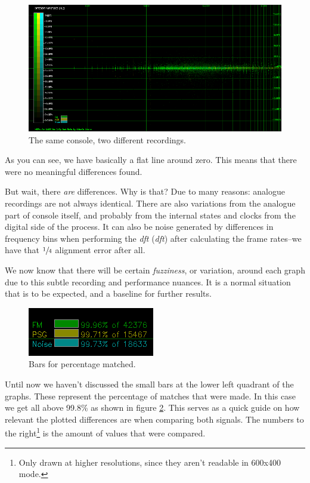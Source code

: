 \documentclass[10pt,a4paper]{report}
\newcommand{\define}[1]{\textit{\acrlong{#1}} (\textit{\acrshort{#1}})}
\begin{document}
\begin{figure}[H]
	\centering
	\includegraphics[width=1\linewidth]{images/interpretation/Plot2-Sameconsole.png}
	\caption[Same console compared]{The same console, two different recordings.}
	\label{fig:plot2-sameconsole}
\end{figure}

As you can see, we have basically a flat line around zero. This means that there were no meaningful differences found. 

But wait, there \textit{are} differences. Why is that? Due to many reasons: analogue recordings are not always identical. There are also variations from the analogue part of console itself, and probably from the internal states and clocks from the digital side of the process. It can also be noise generated by differences in frequency bins when performing the \define{dft} after calculating the frame rates--we have that $\sfrac{1}{4}$ alignment error after all.

We now know that there will be certain \textit{fuzziness}, or variation, around each graph due to this subtle recording and performance nuances. It is a normal situation that is to be expected, and a baseline for further results.

\begin{figure}[H]
	\centering
	\includegraphics[width=0.4\linewidth]{images/interpretation/Plot2-Sameconsole-bars.png}
	\caption[Bars]{Bars for percentage matched.}
	\label{fig:plot2-sameconsole-bars}
\end{figure}

Until now we haven't discussed the small bars at the lower left quadrant of the graphs. These represent the percentage of matches that were made. In this case we get all above 99.8\% as shown in figure \ref{fig:plot2-sameconsole-bars}. This serves as a quick guide on how relevant the plotted differences are when comparing both signals. The numbers to the right\footnote{Only drawn at higher resolutions, since they aren't readable in 600x400 mode.} is the amount of values that were compared.
\end{document}
